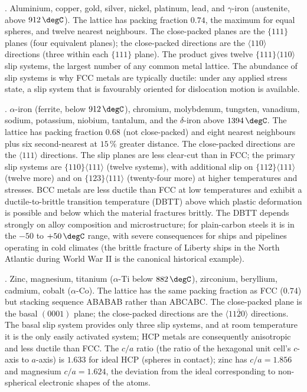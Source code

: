 . Aluminium, copper, gold, silver, nickel,
platinum, lead, and $\gamma$-iron (austenite, above $912\,\degC$).
The lattice has packing fraction $0.74$, the maximum for equal
spheres, and twelve nearest neighbours. The close-packed planes are
the $\{111\}$ planes (four equivalent planes); the close-packed
directions are the $\langle 110 \rangle$ directions (three within
each $\{111\}$ plane). The product gives twelve $\{111\}\langle 110
\rangle$ slip systems, the largest number of any common metal lattice.
The abundance of slip systems is why FCC metals are typically ductile:
under any applied stress state, a slip system that is favourably
oriented for dislocation motion is available.

. $\alpha$-iron (ferrite, below $912\,\degC$),
chromium, molybdenum, tungsten, vanadium, sodium, potassium, niobium,
tantalum, and the $\delta$-iron above $1394\,\degC$. The lattice has
packing fraction $0.68$ (not close-packed) and eight nearest
neighbours plus six second-nearest at $15\,\%$ greater distance. The
close-packed directions are the $\langle 111 \rangle$ directions. The
slip planes are less clear-cut than in FCC; the primary slip systems
are $\{110\}\langle 111 \rangle$ (twelve systems), with additional
slip on $\{112\}\langle 111 \rangle$ (twelve more) and on
$\{123\}\langle 111 \rangle$ (twenty-four more) at higher temperatures
and stresses. BCC metals are less ductile than FCC at low temperatures
and exhibit a ductile-to-brittle transition temperature (DBTT) above
which plastic deformation is possible and below which the material
fractures brittly. The DBTT depends strongly on alloy composition and
microstructure; for plain-carbon steels it is in the $-50$ to $+50\,
\degC$ range, with severe consequences for ships and pipelines
operating in cold climates (the brittle fracture of Liberty ships in
the North Atlantic during World War II is the canonical historical
example).

. Zinc, magnesium, titanium ($\alpha$-Ti below
$882\,\degC$), zirconium, beryllium, cadmium, cobalt ($\alpha$-Co).
The lattice has the same packing fraction as FCC ($0.74$) but stacking
sequence ABABAB rather than ABCABC. The close-packed plane is the
basal $(0001)$ plane; the close-packed directions are the
$\langle 11\bar{2}0 \rangle$ directions. The basal slip system
provides only three slip systems, and at room temperature it is the
only easily activated system; HCP metals are consequently anisotropic
and less ductile than FCC. The $c/a$ ratio (the ratio of the
hexagonal unit cell's $c$-axis to $a$-axis) is $1.633$ for ideal HCP
(spheres in contact); zinc has $c/a = 1.856$ and magnesium $c/a =
1.624$, the deviation from the ideal corresponding to non-spherical
electronic shapes of the atoms.

